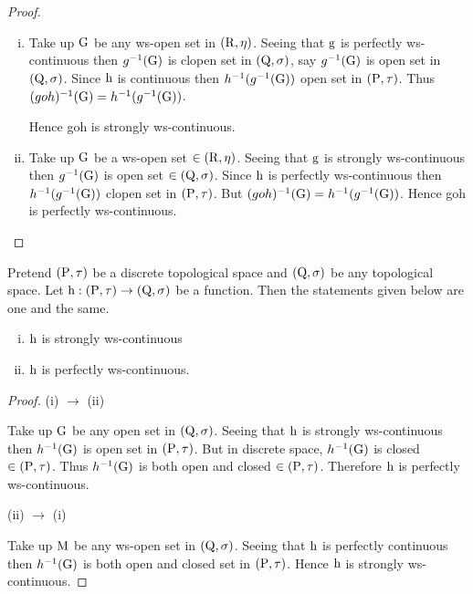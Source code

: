 \begin{proof}
\begin{enumerate}[(i)]
\item Take up $\mathrm{G}$ be any ws-open set in $(\mathrm{R},\eta)$. Seeing that $\mathrm{g}$ is perfectly ws-continuous then $g^{-1}(\mathrm{G})$ is clopen set in $(\mathrm{Q},\sigma)$, say $g^{-1}(\mathrm{G})$ is open set in $(\mathrm{Q},\sigma)$. Since $\mathrm{h}$ is continuous then $h^{-1} (g^{-1}(\mathrm{G}))$ open set in $(\mathrm{P},\tau)$. Thus $(goh)^{-1}(\mathrm{G}) = h^{-1} (g^{-1}(\mathrm{G}))$.

Hence goh is strongly ws-continuous.

\item Take up $\mathrm{G}$ be a ws-open set $\in (\mathrm{R}, \eta)$. Seeing that $\mathrm{g}$ is strongly ws-continuous then $g^{-1}(\mathrm{G})$ is open set $\in (\mathrm{Q},\sigma)$. Since $\mathrm{h}$ is perfectly ws-continuous then $h^{-1} (g^{-1}(\mathrm{G}))$ clopen set in $(\mathrm{P},\tau )$. But $(goh)^{-1}(\mathrm{G}) = h^{-1}(g^{-1}(\mathrm{G}))$. Hence goh is perfectly ws-continuous.
\end{enumerate}
\end{proof}

\begin{thm}\label{thm3.3.14}
Pretend $(\mathrm{P},\tau)$ be a discrete topological space and $(\mathrm{Q},\sigma)$ be any topological space. Let $\mathrm{h}: (\mathrm{P},\tau)\to (\mathrm{Q}, \sigma)$ be a function. Then the statements given below are one and the same.
\begin{enumerate}[(i)]
\item $\mathrm{h}$ is strongly ws-continuous
\item $\mathrm{h}$ is perfectly ws-continuous.
\end{enumerate}
\end{thm}

\begin{proof}
(i) $\to$ (ii)

Take up $\mathrm{G}$ be any open set in $(\mathrm{Q},\sigma)$. Seeing that $\mathrm{h}$ is strongly ws-continuous then $h^{-1}(\mathrm{G})$ is open set in $(\mathrm{P},\tau)$. But in discrete space, $h^{-1}(\mathrm{G})$ is closed $\in (\mathrm{P}, \tau)$. Thus $h^{-1}(\mathrm{G})$ is both open and closed $\in (\mathrm{P},\tau)$. Therefore $\mathrm{h}$ is perfectly ws-continuous.

(ii) $\to$ (i)

Take up $\mathrm{M}$ be any ws-open set in $(\mathrm{Q},\sigma)$. Seeing that $\mathrm{h}$ is perfectly continuous then $h^{-1}(\mathrm{G})$ is both open and closed set in $(\mathrm{P},\tau)$. Hence $\mathrm{h}$ is strongly ws-continuous.
\end{proof}


